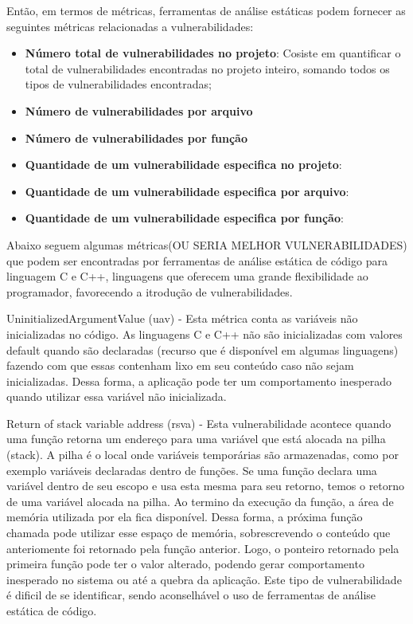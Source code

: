 %

Então, em termos de métricas, ferramentas de análise estáticas podem fornecer as seguintes métricas relacionadas a vulnerabilidades:

\begin{itemize}
\item \textbf{Número total de vulnerabilidades no projeto}: Cosiste em quantificar o total de vulnerabilidades encontradas no projeto inteiro, somando todos os tipos de vulnerabilidades encontradas;
\item \textbf{Número de vulnerabilidades por arquivo}
\item \textbf{Número de vulnerabilidades por função}
\item \textbf{Quantidade de um vulnerabilidade especifica no projeto}:
\item \textbf{Quantidade de um vulnerabilidade especifica por arquivo}:
\item \textbf{Quantidade de um vulnerabilidade especifica por função}:
\end{itemize}

%
Abaixo seguem algumas métricas(OU SERIA MELHOR VULNERABILIDADES) que podem ser encontradas por ferramentas de análise estática de código para linguagem C e C++, linguagens que oferecem uma grande flexibilidade ao programador, favorecendo a itrodução de vulnerabilidades.

UninitializedArgumentValue (uav) - Esta métrica conta as variáveis não inicializadas no código. As linguagens C e C++ não são inicializadas com valores default quando são declaradas (recurso que é disponível em algumas linguagens) fazendo com que essas contenham lixo em seu conteúdo caso não sejam inicializadas. Dessa forma, a aplicação pode ter um comportamento inesperado quando utilizar essa variável não inicializada.

%

Return of stack variable address (rsva) - Esta vulnerabilidade acontece quando uma função retorna um endereço para uma variável que está alocada na pilha (stack). A pilha é o local onde variáveis temporárias são armazenadas, como por exemplo variáveis declaradas dentro de funções. Se uma função declara uma variável dentro de seu escopo e usa esta mesma para seu retorno, temos o retorno de uma variável alocada na pilha. Ao termino da execução da função, a área de memória utilizada por ela fica disponível. Dessa forma, a próxima função chamada pode utilizar esse espaço de memória, sobrescrevendo o conteúdo que anteriomente foi retornado pela função anterior. Logo, o ponteiro retornado pela primeira função pode ter o valor alterado, podendo gerar comportamento inesperado no sistema ou até a quebra da aplicação. Este tipo de vulnerabilidade é dificil de se identificar, sendo aconselhável o uso de ferramentas de análise estática de código.


